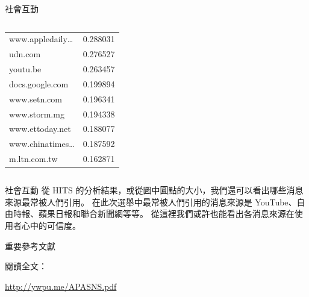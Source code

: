 \documentclass{beamer}
\begin{document}
\begin{CJK}{UTF8}{bkai}
\begin{frame}{社會互動}
\begin{columns}
\begin{column}{.48\textwidth}
\begin{table}
\begin{tabular}{@{}lc@{}}
    www.appledaily\dots & 0.288031 \\
    udn.com & 0.276527 \\
    youtu.be & 0.263457 \\
    docs.google.com & 0.199894 \\
    www.setn.com & 0.196341 \\
    www.storm.mg & 0.194338 \\
    www.ettoday.net & 0.188077 \\
    www.chinatimes\dots & 0.187592 \\
    m.ltn.com.tw & 0.162871 \\
    \bottomrule
  \end{tabular}
  \end{table}
\end{column}
\end{columns}
\end{frame}

\begin{frame}{社會互動}
\justifying
\qquad 從 HITS 的分析結果，或從圖中圓點的大小，我們還可以看出哪些消息來源最常被人們引用。%
在此次選舉中最常被人們引用的消息來源是 YouTube、自由時報、蘋果日報和聯合新聞網等等。%
從這裡我們或許也能看出各消息來源在使用者心中的可信度。%
\end{frame}

\begin{frame}{重要參考文獻}
\nocite{*}


\end{frame}

\begin{frame}
\centering
{\LARGE 閱讀全文：\par\url{http://ywpu.me/APASNS.pdf}\par}
\end{frame}

\end{CJK}
\end{document}
